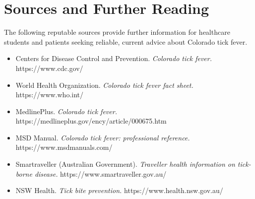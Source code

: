 \section*{Sources and Further Reading}
The following reputable sources provide further information for healthcare students and patients seeking reliable, current advice about Colorado tick fever.

\begin{itemize}
    \item Centers for Disease Control and Prevention. \textit{Colorado tick fever.} https://www.cdc.gov/
    \item World Health Organization. \textit{Colorado tick fever fact sheet.} https://www.who.int/
    \item MedlinePlus. \textit{Colorado tick fever.} https://medlineplus.gov/ency/article/000675.htm
    \item MSD Manual. \textit{Colorado tick fever: professional reference.} https://www.msdmanuals.com/
    \item Smartraveller (Australian Government). \textit{Traveller health information on tick-borne disease.} https://www.smartraveller.gov.au/
    \item NSW Health. \textit{Tick bite prevention.} https://www.health.nsw.gov.au/
\end{itemize}
